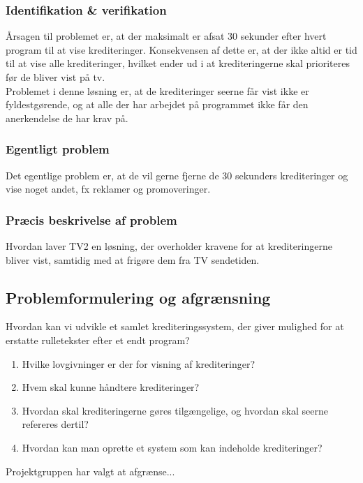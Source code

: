 \subsubsection{Identifikation \& verifikation}
Årsagen til problemet er, at der maksimalt er afsat 30 sekunder efter hvert program til at vise krediteringer. Konsekvensen af dette er, at der ikke altid er tid til at vise alle krediteringer, hvilket ender ud i at krediteringerne skal prioriteres før de bliver vist på tv.\\

Problemet i denne løsning er, at de krediteringer seerne får vist ikke er fyldestgørende, og at alle der har arbejdet på programmet ikke får den anerkendelse de har krav på.

\subsubsection{Egentligt problem}
Det egentlige problem er, at de vil gerne fjerne de 30 sekunders krediteringer og vise noget andet, fx reklamer og promoveringer.

\subsubsection{Præcis beskrivelse af problem}
Hvordan laver TV2 en løsning, der overholder kravene for at  krediteringerne bliver vist, samtidig med at frigøre dem fra TV sendetiden.

\subsection{Problemformulering og afgrænsning}
Hvordan kan vi udvikle et samlet krediteringssystem, der giver mulighed for at erstatte rulletekster efter et endt program?

\begin{enumerate}
    \item Hvilke lovgivninger er der for visning af krediteringer?
    \item Hvem skal kunne håndtere krediteringer?
    \item Hvordan skal krediteringerne gøres tilgængelige, og hvordan skal seerne refereres dertil?
    \item Hvordan kan man oprette et system som kan indeholde krediteringer?
\end{enumerate}

\noindent
Projektgruppen har valgt at afgrænse...